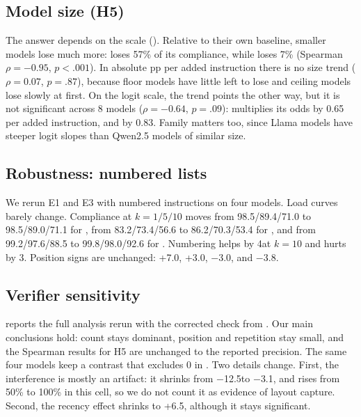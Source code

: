 \subsection{Model size (H5)}

 The answer depends on the scale (). Relative to their own baseline, smaller models lose much more: \qhalf loses 57\% of its compliance, while \qeight loses 7\% (Spearman $\rho=-0.95$, $p<.001$). In absolute pp per added instruction there is no size trend ($\rho=0.07$, $p=.87$), because floor models have little left to lose and ceiling models lose slowly at first. On the logit scale, the trend points the other way, but it is not significant across 8 models ($\rho=-0.64$, $p=.09$): \qeight multiplies its odds by 0.65 per added instruction, and \qhalf by 0.83. Family matters too, since Llama models have steeper logit slopes than Qwen2.5 models of similar size.



\subsection{Robustness: numbered lists}

We rerun E1 and E3 with numbered instructions on four models. Load curves barely change. Compliance at $k=1/5/10$ moves from 98.5/89.4/71.0 to 98.5/89.0/71.1 for \lthree, from 83.2/73.4/56.6 to 86.2/70.3/53.4 for \qthree, and from 99.2/97.6/88.5 to 99.8/98.0/92.6 for \qeight. Numbering helps \qeight by 4\pp at $k=10$ and hurts \qthree by 3\pp. Position signs are unchanged: \qthree +7.0\pp, \qeight +3.0\pp, \lthree $-$3.0\pp, and \qone $-$3.8\pp.

\subsection{Verifier sensitivity}
\label{sec:sensitivity}

 reports the full analysis rerun with the corrected  check from . Our main conclusions hold: count stays dominant, position and repetition stay small, and the Spearman results for H5 are unchanged to the reported precision. The same four models keep a contrast that excludes 0 in . Two details change. First, the  interference is mostly an artifact: it shrinks from $-$12.5\pp to $-$3.1\pp, and \qthree rises from 50\% to 100\% in this cell, so we do not count it as evidence of layout capture. Second, the \qthree recency effect shrinks to +6.5\pp, although it stays significant.


